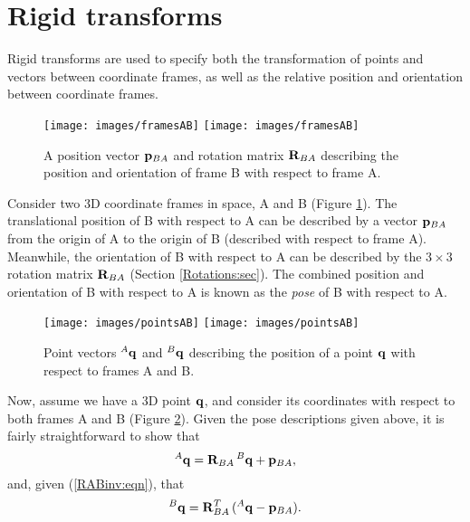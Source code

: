 \section{Rigid transforms}
\label{RigidTransforms:sec}

Rigid transforms are used to specify both the transformation of points
and vectors between coordinate frames, as well as the relative
position and orientation between coordinate frames.

\begin{figure}[ht]
\begin{center}
 \iflatexml
   \texttt{[image: images/framesAB]}
 \else
   \texttt{[image: images/framesAB]}
 \fi
\end{center}
\caption{A position vector ${\bf p}_{BA}$ and rotation matrix
${\bf R}_{BA}$ describing the position and orientation of frame B
with respect to frame A.}
\label{framesAB:fig}
\end{figure}

Consider two 3D coordinate frames in space, A and B (Figure
\ref{framesAB:fig}). The translational position of B with respect to A
can be described by a vector ${\bf p}_{BA}$ from the origin of A to the
origin of B (described with respect to frame A). Meanwhile, the
orientation of B with respect to A can be described by the $3 \times
3$ rotation matrix ${\bf R}_{BA}$ (Section \ref{Rotations:sec}).  The
combined position and orientation of B with respect to A is known as
the {\it pose} of B with respect to A.

\begin{figure}[t]
\begin{center}
 \iflatexml
   \texttt{[image: images/pointsAB]}
 \else
   \texttt{[image: images/pointsAB]}
 \fi
\end{center}
\caption{Point vectors ${}^A{\bf q}$ and ${}^B{\bf q}$ describing
the position of a point ${\bf q}$ with respect to frames A and B.}
\label{pointsAB:fig}
\end{figure}

Now, assume we have a 3D point ${\bf q}$, and consider its coordinates with
respect to both frames A and B (Figure \ref{pointsAB:fig}). Given the
pose descriptions given above, it is fairly straightforward to show
that
%
\begin{equation}
{}^A{\bf q} = {\bf R}_{BA} \, {}^B{\bf q} + {\bf p}_{BA},
\label{pointTransform:eqn}
\end{equation}
%
and, given (\ref{RABinv:eqn}), that
%
\begin{equation}
{}^B{\bf q} = {\bf R}_{BA}^T \, ({}^A{\bf q} - {\bf p}_{BA}).
\label{pointInvTransform:eqn}
\end{equation}
%

